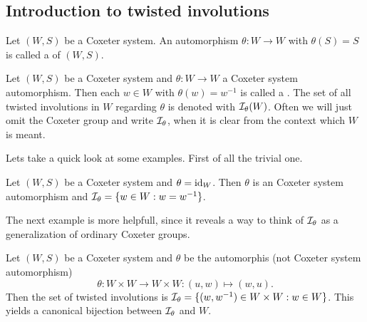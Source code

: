 \subsection{Introduction to twisted involutions}
\label{sec:twisted-involutions-introduction}

\begin{defi}
	Let $(W,S)$ be a Coxeter system. An automorphism $\theta : W \to W$ with $\theta(S) = S$ is called a  of $(W,S)$.
\end{defi}

\begin{defi}
	Let $(W,S)$ be a Coxeter system and $\theta : W \to W$ a Coxeter system automorphism. Then each $w \in W$ with $\theta(w) = w^{-1}$ is called a . The set of all twisted involutions in $W$ regarding $\theta$ is denoted with $\mathcal{I}_{\theta}(W)$. Often we will just omit the Coxeter group and write $\mathcal{I}_{\theta}$, when it is clear from the context which $W$ is meant.
\end{defi}

Lets take a quick look at some examples. First of all the trivial one.

\begin{exam}
	Let $(W,S)$ be a Coxeter system and $\theta = \operatorname{id}_W$. Then $\theta$ is an Coxeter system automorphism and $\mathcal{I}_{\theta} = \{ w \in W : w = w^{-1} \}$.
\end{exam}

The next example is more helpfull, since it reveals a way to think of $\mathcal{I}_{\theta}$ as a generalization of ordinary Coxeter groups.

\begin{exam}
	Let $(W,S)$ be a Coxeter system and $\theta$ be the automorphis (not Coxeter system automorphism)
	$$ \theta : W \times W \to W \times W : (u,w) \mapsto (w,u). $$
	Then the set of twisted involutions is $\mathcal{I}_{\theta} = \{ (w,w^{-1}) \in W \times W : w \in W \}$. This yields a canonical bijection between $\mathcal{I}_{\theta}$ and $W$.
\end{exam}
